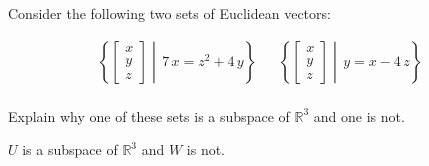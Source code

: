 
\begin{exerciseStatement}


Consider the following two sets of Euclidean vectors: 


\begin{align*}  \left\{ \left[\begin{array}{c}
x \\
y \\
z
\end{array}\right] \middle|\,7 \, x = z^{2} + 4 \, y\right\}  & &   \left\{ \left[\begin{array}{c}
x \\
y \\
z
\end{array}\right] \middle|\,y = x - 4 \, z\right\}  \\ \end{align*}
            

 Explain why one of these sets is a subspace of \(\mathbb{R}^ 3 \) and one is not. 


\end{exerciseStatement}
    
\begin{exerciseAnswer} 


\(U\) is a subspace of \(\mathbb{R}^ 3 \) and \(W\) is not.


\end{exerciseAnswer}
    
